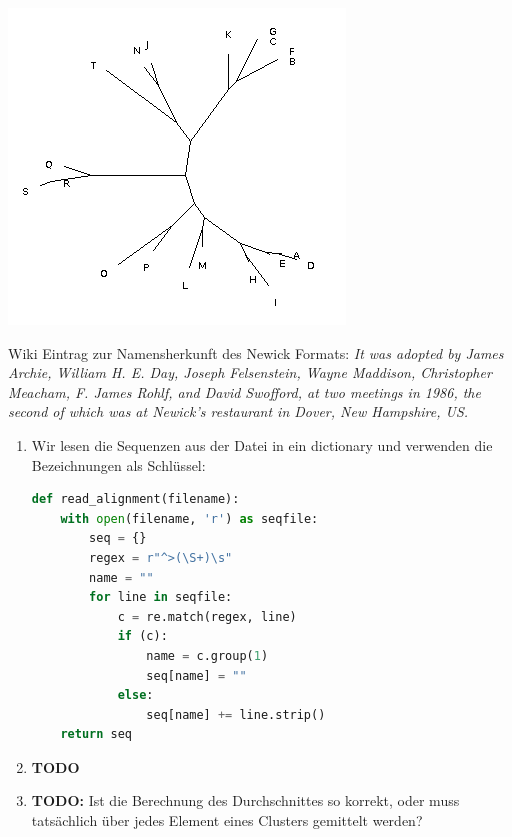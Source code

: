 \documentclass{homework}
\begin{document}
\begin{enumerate}
	\includegraphics[scale=0.4]{u3_aufg2_max_parsimony.png} 

Wiki Eintrag zur Namensherkunft des Newick Formats: \textit{It was adopted by James Archie, William H. E. Day, Joseph Felsenstein, Wayne Maddison, Christopher Meacham, F. James Rohlf, and David Swofford, at two meetings in 1986, the second of which was at Newick's restaurant in Dover, New Hampshire, US.}

\begin{enumerate}
\item Wir lesen die Sequenzen aus der Datei in ein dictionary und verwenden die
Bezeichnungen als Schlüssel:

\begin{lstlisting}[language=python]
def read_alignment(filename):
	with open(filename, 'r') as seqfile:
		seq = {}
		regex = r"^>(\S+)\s"
		name = ""
		for line in seqfile:
			c = re.match(regex, line)
			if (c):
				name = c.group(1)
				seq[name] = ""
			else:
				seq[name] += line.strip()
	return seq
\end{lstlisting}

\item \textbf{TODO}

\item \textbf{TODO:} Ist die Berechnung des Durchschnittes so korrekt, oder muss
tatsächlich über jedes Element eines Clusters gemittelt werden?
\end{enumerate}


\end{enumerate}
\end{document}
